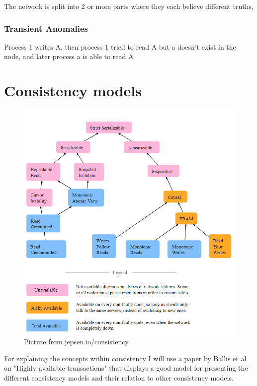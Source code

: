 \documentclass[a4paper,10pt,titlepage]{report}
\begin{document}
The network is split into 2 or more parts where they each believe different truths,


\subsubsection{Transient Anomalies}

Process 1 writes A, then process 1 tried to read A but a doesn't exist in the node, and later process a is able to read A

\newpage
\section{Consistency models}


\begin{figure}
    \centering
       \includegraphics[scale=0.4]{images/consistency models.PNG}
     \caption{Picture from jepsen.io/consistency}
     \label{fig:jepsenioconsistency}
\end{figure}


For explaining the concepts within consistency I will use a paper by Ballis et al on "Highly available transactions"\cite{10.14778/2732232.2732237} that displays a good model for presenting the different consistency models and their relation to other consistency models.\\
\end{document}
